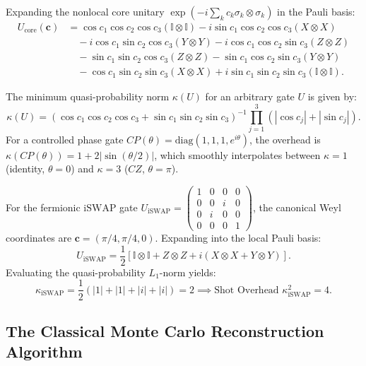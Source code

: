 Expanding the nonlocal core unitary $\exp(-i \sum_k c_k \sigma_k \otimes \sigma_k)$ in the Pauli basis:
\begin{align}
    U_{\text{core}}(\bm{c}) &= \cos c_1 \cos c_2 \cos c_3 (\mathbb{I} \otimes \mathbb{I}) - i \sin c_1 \cos c_2 \cos c_3 (X \otimes X) \nonumber \\
    &\quad - i \cos c_1 \sin c_2 \cos c_3 (Y \otimes Y) - i \cos c_1 \cos c_2 \sin c_3 (Z \otimes Z) \nonumber \\
    &\quad - \sin c_1 \sin c_2 \cos c_3 (Z \otimes Z) - \sin c_1 \cos c_2 \sin c_3 (Y \otimes Y) \nonumber \\
    &\quad - \cos c_1 \sin c_2 \sin c_3 (X \otimes X) + i \sin c_1 \sin c_2 \sin c_3 (\mathbb{I} \otimes \mathbb{I}).
\end{align}

The minimum quasi-probability norm $\kappa(U)$ for an arbitrary gate $U$ is given by:
\begin{equation}
    \kappa(U) = \left( \cos c_1 \cos c_2 \cos c_3 + \sin c_1 \sin c_2 \sin c_3 \right)^{-1} \prod_{j=1}^3 \left( |\cos c_j| + |\sin c_j| \right).
    \label{eq:general_kak_kappa}
\end{equation}
For a controlled phase gate $CP(\theta) = \text{diag}(1, 1, 1, e^{i\theta})$, the overhead is $\kappa(CP(\theta)) = 1 + 2|\sin(\theta/2)|$, which smoothly interpolates between $\kappa=1$ (identity, $\theta=0$) and $\kappa=3$ ($CZ$, $\theta=\pi$).

For the fermionic $\text{iSWAP}$ gate $U_{\text{iSWAP}} = \begin{pmatrix} 1 & 0 & 0 & 0 \\ 0 & 0 & i & 0 \\ 0 & i & 0 & 0 \\ 0 & 0 & 0 & 1 \end{pmatrix}$, the canonical Weyl coordinates are $\bm{c} = (\pi/4, \pi/4, 0)$. Expanding into the local Pauli basis:
\begin{equation}
    U_{\text{iSWAP}} = \frac{1}{2} \left[ \mathbb{I} \otimes \mathbb{I} + Z \otimes Z + i(X \otimes X + Y \otimes Y) \right].
\end{equation}
Evaluating the quasi-probability $L_1$-norm yields:
\begin{equation}
    \kappa_{\text{iSWAP}} = \frac{1}{2} \left( |1| + |1| + |i| + |i| \right) = 2 \implies \text{Shot Overhead } \kappa_{\text{iSWAP}}^2 = 4.
\end{equation}

\subsection{The Classical Monte Carlo Reconstruction Algorithm}
\label{sec:monte_carlo_reconstruction}

